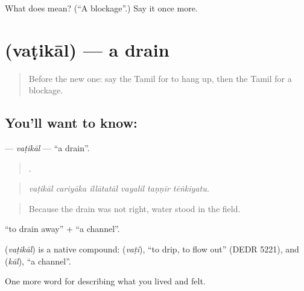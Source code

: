 \begin{tcolorbox}[breakable,colback=teal!4,colframe=teal!35!black,title={Before you move on}]
What does  mean? (\textquotedblleft{}A blockage\textquotedblright{}.) Say it once more.
\end{tcolorbox}
\section[\texorpdfstring{\ta{வடிகால்} (vaṭikāl)}{வடிகால் (vaṭikāl)}]{ (vaṭikāl) — a drain}

\label{lesson:TA-C523-vatikal}



\begin{quote}
Before the new one: say the Tamil for to hang up, then the Tamil for a blockage.
\end{quote}

\subsection*{You'll want to know: }
\textbf{} — \emph{vaṭikāl} — \textquotedblleft{}a drain\textquotedblright{}.

\begin{quote}
     .
\end{quote}

\begin{quote}
\emph{vaṭikāl cariyāka illātatāl vayalil taṇṇīr tēṅkiyatu.}
\end{quote}

\begin{quote}
Because the drain was not right, water stood in the field.
\end{quote}

 \textquotedblleft{}to drain away\textquotedblright{} +  \textquotedblleft{}a channel\textquotedblright{}.

\begin{cousinweb}
\textbf{} (\emph{vaṭikāl}) is a native compound:  (\emph{vaṭi}), \textquotedblleft{}to drip, to flow out\textquotedblright{} (DEDR 5221), and  (\emph{kāl}), \textquotedblleft{}a channel\textquotedblright{}.
\end{cousinweb}

\begin{grammarlens}[title={What you've built}]
One more word for describing what you lived and felt.
\end{grammarlens}

